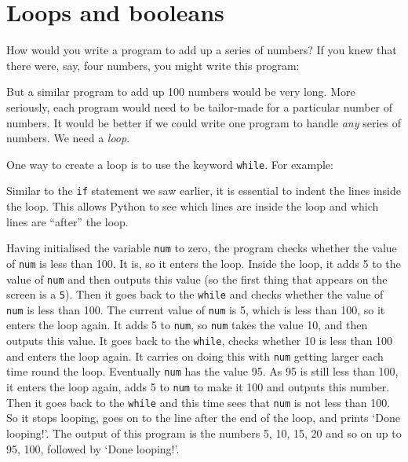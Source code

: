 \section{Loops and booleans}

How would you write a program to add up a series of numbers?
If you knew that there were, say, four numbers, you might write
this program:


But a similar program to add up 100 numbers would be very long.
More seriously, each program would need to be tailor-made for a particular
number of numbers.  It would be better if we could write one program
to handle \emph{any} series of numbers.  We need a \emph{loop}.

One way to create a loop is to use the keyword \texttt{while}.
For example:


Similar to the \texttt{if} statement we saw earlier,
it is essential to indent the lines inside the loop.
This allows Python to see which lines are inside the loop and which
lines are ``after'' the loop.


Having initialised the variable \texttt{num} to zero, the program checks
whether the value of \texttt{num} is less than 100.  It is, so it
enters the loop.  Inside the loop, it adds 5 to the value of
\texttt{num} and then outputs this value (so the first thing that
appears on the screen is a \texttt{5}).  Then it goes back to the
  \texttt{while} and checks whether the value of \texttt{num} is less than
100.  The current value of \texttt{num} is 5, which is less than 100,
so it enters the loop again.  It adds 5 to \texttt{num}, so
\texttt{num} takes the value 10, and then outputs this value.  It goes back
to the \texttt{while}, checks whether 10 is less than 100 and enters
the loop again.  It carries on doing this with \texttt{num} getting
larger each time round the loop.  Eventually \texttt{num} has the
value 95. As 95 is still less than 100, it enters the loop again, adds 5 to
\texttt{num} to make it 100 and outputs this number.  Then it goes
back to the \texttt{while} and this time sees that \texttt{num} is not
less than 100.  So it stops looping, goes on to the line after the
end of the loop, and prints `Done looping!'.
The output of this program is the numbers 5,
10, 15, 20 and so on up to 95, 100, followed by `Done looping!'.

